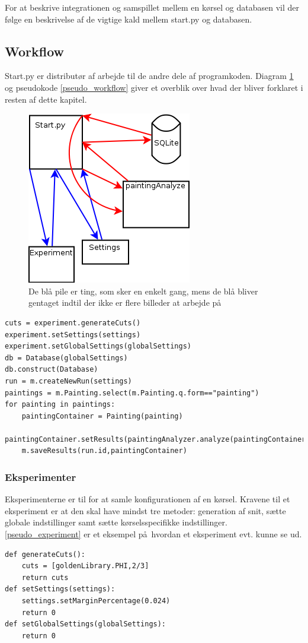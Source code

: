 {
For at beskrive integrationen og samspillet mellem en kørsel og
databasen vil der følge en beskrivelse af de vigtige kald mellem 
start.py og databasen. 
\subsection{Workflow}
Start.py er distributør af arbejde til de andre dele af programkoden.
Diagram \ref{start_workflow} og pseudokode \ref{pseudo_workflow} giver et overblik over hvad der bliver
forklaret i resten af dette kapitel. 
\begin{figure}[h!]
	\begin{center}
		\includegraphics[scale=0.5]{afsnit/implementation/billeder/workflow_start_py.png}
	\end{center}
	\caption{De blå pile er ting, som sker en enkelt gang, mens de blå
	\label{start_workflow}
	bliver gentaget indtil der ikke er flere billeder at arbejde på}
\end{figure}
\begin{lstlisting}[caption={Pseudokode for
start},frame=tb,label={pseudo_workflow}]
cuts = experiment.generateCuts()
experiment.setSettings(settings)
experiment.setGlobalSettings(globalSettings)
db = Database(globalSettings)
db.construct(Database)
run = m.createNewRun(settings)
paintings = m.Painting.select(m.Painting.q.form=="painting")
for painting in paintings:
	paintingContainer = Painting(painting)
	paintingContainer.setResults(paintingAnalyzer.analyze(paintingContainer,settings))
	m.saveResults(run.id,paintingContainer)
\end{lstlisting}
\subsubsection{Eksperimenter}
Eksperimenterne er til for at samle konfigurationen af en kørsel.
Kravene til et eksperiment er at den skal have mindst tre metoder:
generation af snit, sætte globale indstillinger samt sætte
kørselsspecifikke indstillinger. \ref{pseudo_experiment} er et eksempel
på hvordan et eksperiment evt. kunne se ud.
\begin{lstlisting}[caption={Pseudokode for et
experiment, som checker på $\varPhi$},frame=tb,label={pseudo_experiment}]
def generateCuts():
	cuts = [goldenLibrary.PHI,2/3]
	return cuts
def setSettings(settings):
	settings.setMarginPercentage(0.024)
	return 0
def setGlobalSettings(globalSettings):
	return 0
\end{lstlisting}
}
